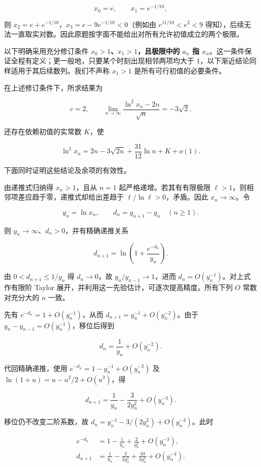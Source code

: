\documentclass[11pt,a4paper]{article}
\begin{document}
\[
x_0=e,\qquad x_1=e^{-1/10},
\]

则 \(x_2=e+e^{-1/10}\)，\(x_3=e-9e^{-1/10}<0\)（例如由
\(e^{11/10}<e^2<9\)
得知），后续无法一直取实对数。因此原题按字面不能给出对所有允许初值成立的两个极限。

以下明确采用充分修订条件 \textbf{\(x_0>1\)、\(x_1>1\)，且极限中的
\(a_n\) 指
\(x_n\)}。这一条件保证全程有定义；更一般地，只要某个时刻出现相邻两项均大于
\(1\)，以下渐近结论同样适用于其后续数列。我们不声称 \(x_1>1\)
是所有可行初值的必要条件。

在上述修订条件下，所求结果为

\[
\boxed{c=2,\qquad
\lim_{n\to\infty}\frac{\ln^2x_n-2n}{\sqrt n}=-3\sqrt2.}
\]

还存在依赖初值的实常数 \(K\)，使

\[
\boxed{\ln^2x_n
=2n-3\sqrt{2n}+\frac{31}{12}\ln n+K+o(1).}
\]

下面同时证明这些结论及余项的有效性。

由递推式归纳得 \(x_n>1\)，且从 \(n=1\) 起严格递增。若其有有限极限
\(\ell>1\)，则相邻项差应趋于零，递推式却给出差趋于
\(\ell/\ln\ell>0\)，矛盾。因此 \(x_n\to\infty\)。令

\[
y_n=\ln x_n,\qquad d_n=y_{n+1}-y_n\quad(n\ge1).
\]

则 \(y_n\to\infty\)、\(d_n>0\)，并有精确递推关系

\[
d_{n+1}=\ln\left(1+\frac{e^{-d_n}}{y_n}\right).
\]

由 \(0<d_{n+1}\le1/y_n\) 得 \(d_n\to0\)，故 \(y_n/y_{n-1}\to1\)，进而
\(d_n=O(y_n^{-1})\)。对上式作有限阶 Taylor
展开，并利用这一先验估计，可逐次提高精度。所有下列 \(O\) 常数对充分大的
\(n\) 一致。

先有 \(e^{-d_n}=1+O(y_n^{-1})\)，从而
\(d_{n+1}=y_n^{-1}+O(y_n^{-2})\)。由于
\(y_n-y_{n-1}=O(y_n^{-1})\)，移位后得到

\[
d_n=\frac1{y_n}+O(y_n^{-2}).
\]

代回精确递推，使用 \(e^{-d_n}=1-y_n^{-1}+O(y_n^{-2})\) 及
\(\ln(1+u)=u-u^2/2+O(u^3)\)，得

\[
d_{n+1}=\frac1{y_n}-\frac3{2y_n^2}+O(y_n^{-3}).
\]

移位仍不改变二阶系数，故 \(d_n=y_n^{-1}-3/(2y_n^2)+O(y_n^{-3})\)。此时

\[
\begin{aligned}
e^{-d_n}&=1-\frac1{y_n}+\frac2{y_n^2}+O(y_n^{-3}),\\
d_{n+1}&=\frac1{y_n}-\frac3{2y_n^2}+\frac{10}{3y_n^3}+O(y_n^{-4}).
\end{aligned}
\]
\end{document}
